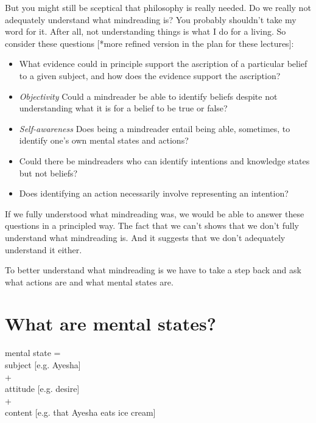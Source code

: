 \documentclass[12pt,\papersize]{extarticle}
\begin{document}
But you might still be sceptical that philosophy is really needed.  Do we really not adequately understand what mindreading is?
You probably shouldn't take my word for it.
After all, not understanding things is what I do for a living.
So consider these questions 
[*more refined version in the plan for these lectures]:
\begin{itemize}
%
\item What evidence could in principle support the ascription of a particular belief to a given subject, and how does the evidence support the ascription?
%
\item \emph{Objectivity} Could a mindreader be able to identify beliefs despite not  understanding what it is for a belief to be true or false? 
%
\item \emph{Self-awareness}  Does being a mindreader entail being able, sometimes, to identify one's own mental states and actions? 
%
\item Could there be mindreaders who can identify intentions and knowledge states but not beliefs?
%
\item Does identifying an action necessarily involve representing an intention?
%
\end{itemize}
If we fully understood what mindreading was, we would be able to answer these questions in a principled way.
The fact that we can't shows that we don't fully understand what mindreading is.
And it suggests that we don't adequately understand it either.

To better understand what mindreading is we have to take a step back and ask what actions are and what mental states are.







\section{What are mental states?}

mental state = 
	\\ \hspace*{10 mm} subject [e.g. Ayesha] 
	\\ \hspace*{10 mm} + 
	\\ \hspace*{10 mm} attitude [e.g. desire] 
	\\ \hspace*{10 mm} + 
	\\ \hspace*{10 mm} content [e.g. that Ayesha eats ice cream]
\end{document}
